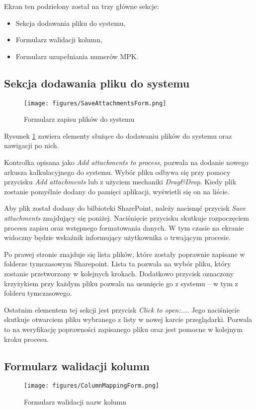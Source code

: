  Ekran ten podzielony został na trzy główne sekcje:
 \begin{itemize}
    \item Sekcja dodawania pliku do systemu,
    \item Formularz walidacji kolumn,
    \item Formularz uzupełniania numerów MPK.
 \end{itemize}

 \subsection*{Sekcja dodawania pliku do systemu}
 \begin{figure}[H]
     \centering
     \texttt{[image: figures/SaveAttachmentsForm.png]}
     \caption{Formularz zapisu plików do systemu}
     \label{fig:SaveAttachmentsForm}
 \end{figure}
 Rysunek \ref{fig:SaveAttachmentsForm} zawiera elementy służące do dodawaniu plików do systemu oraz nawigacji po nich.

 Kontrolka opisana jako \emph{Add attachments to process}, pozwala na dodanie nowego arkusza kalkulacyjnego do systemu. Wybór pliku odbywa się przy pomocy przycisku \emph{Add attachments} lub z użyciem mechaniki \emph{Drag\&Drop}. Kiedy plik zostanie pomyślnie dodany do pamięci aplikacji, wyświetli się on na liście.

 Aby plik został dodany do bilbioteki SharePoint, należy nacisnąć przycisk \emph{Save attachments} znajdujący się poniżej. Naciśnięcie przycisku skutkuje rozpoczęciem procesu zapisu oraz wstępnego formatowania danych. W tym czasie na ekranie widoczny będzie wskaźnik informujący użytkownika o trwającym procesie.

 Po prawej stronie znajduje się lista plików, które zostały poprawnie zapisane w folderze tymczasowym Sharepoint. Lista ta pozwala na wybór pliku, który zostanie przetworzony w kolejnych krokach. Dodatkowo przycisk oznaczony krzyżykiem przy każdym pliku pozwala na usunięcie go z systemu -- w tym z folderu tymczasowego.
 
 Ostatnim elementem tej sekcji jest przycisk \emph{Click to open:...}.
 Jego naciśnięcie skutkuje otwarciem pliku wybranego z listy w nowej karcie przeglądarki. Pozwala to na weryfikację poprawności zapisanego pliku oraz jest pomocne w kolejnym kroku procesu.

\subsection{Formularz walidacji kolumn} 
  \begin{figure}[h]
     \centering
     \texttt{[image: figures/ColumnMappingForm.png]}
     \caption{Formularz walidacji nazw kolumn}
     \label{fig:columnmappingform}
 \end{figure}

